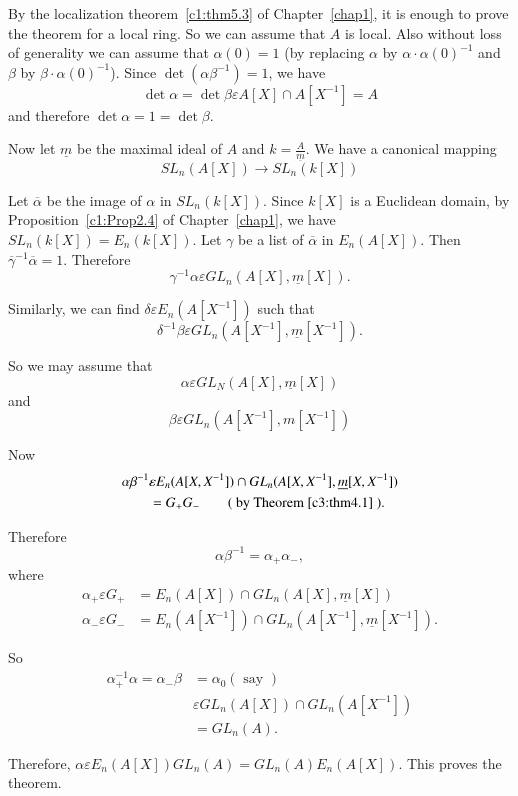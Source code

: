 \begin{Proof}
By the localization theorem~\ref{c1:thm5.3} of Chapter~\ref{chap1}, it
is enough to prove the theorem for a local ring. So we can assume that
$A$ is local. Also without loss of generality we can assume that
$\alpha(0)=1$ (by replacing $\alpha$ by $\alpha\cdot \alpha (0)^{-1}$
and $\beta$ by $\beta\cdot \alpha(0)^{-1}$). Since $\det
(\alpha\beta^{-1})=1$, we have 
$$
\det \alpha =\det \beta \varepsilon A[X]\cap A[X^{-1}]=A
$$
and therefore $\det \alpha=1=\det \beta$.

Now let $\underline{m}$ be the maximal ideal of $A$ and
$k=\frac{A}{\underline{m}}$. We have a canonical mapping
$$
SL_n(A[X])\rightarrow SL_n(k[X])
$$

Let $\overline{\alpha}$ be the image of $\alpha$ in
$SL_n(k[X])$. Since $k[X]$ is a Euclidean domain, by
Proposition~\ref{c1:Prop2.4} of Chapter~\ref{chap1}, we have
$SL_n(k[X])=E_n(k[X])$. Let $\gamma$ be a list of $\overline{\alpha}$
in $E_n(A[X])$. Then ${\overline{\gamma}^{-1}}\overline{\alpha}=1$. Therefore
$$
\gamma^{-1}\alpha\varepsilon GL_n(A[X],\underline{m}[X]).
$$

Similarly, we can find $\delta \varepsilon E_n(A[X^{-1}])$ such that 
$$
\delta^{-1}\beta \varepsilon GL_n\left(A[X^{-1}], \underline{m}[X^{-1}]\right).
$$

So we may assume that 
$$
\alpha\varepsilon GL_N(A[X],\underline{m}[X])
$$
and 
$$
\beta \varepsilon GL_n\left(A[X^{-1}], m[X^{-1}]\right)
$$

Now
\begin{align*}
\alpha\beta^{-1}&\varepsilon E_n(A[X,X^{-1}])\cap
GL_n(A[X,X^{-1}],\underline{m}[X,X^{-1}])\\
&=G_+G_{-}\qquad ( \text{ by Theorem~\ref{c3:thm4.1} }).
\end{align*}

Therefore
$$
\alpha\beta^{-1}=\alpha_+\alpha_{-},
$$
where
\begin{align*}
\alpha_+\varepsilon G_+ &=E_n(A[X])\cap GL_n(A[X],\underline{m}[X])\\
\alpha_{-}\varepsilon G_{-}&=E_n\left(A[X^{-1}]\right) \cap GL_n\left(A[X^{-1}], \underline{m}[X^{-1}]\right).
\end{align*}

So 
$$
\begin{aligned}
\alpha^{-1}_+\alpha=\alpha_{-}\beta&=\alpha_0( \text{ say })\\
&{}\varepsilon GL_n(A[X])\cap GL_n\left(A[X^{-1}]\right)\\
&{}=GL_n(A).
\end{aligned}
$$

Therefore, $\alpha\varepsilon E_n(A[X])GL_n(A)=GL_n(A)E_n(A[X])$. This
proves the theorem.
\enprf
\end{Proof}

